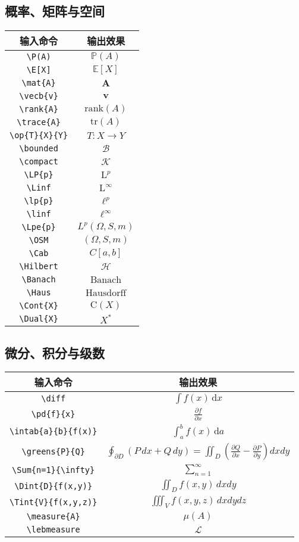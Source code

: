 \documentclass[12pt,a4paper]{ctexart}
\providecommand{\E}{\ensuremath{\mathbb{E}}} %
\providecommand{\P}{\ensuremath{\mathbb{P}}} %
\newcommand{\mat}[1]{\mathbf{#1}} %
\newcommand{\vecb}[1]{\mathbf{#1}} %
\newcommand{\rank}[1]{\mathrm{rank}(#1)} %
\newcommand{\trace}[1]{\mathrm{tr}(#1)} %
\newcommand{\Sum}[2]{\sum\limits_{#1}^{#2}}
\newcommand{\Dint}[2]{\iint_{#1} #2 \, dx dy}
\newcommand{\Tint}[2]{\iiint_{#1} #2 \, dx dy dz}
\newcommand{\measure}[1]{\mu\left( #1 \right)}
\newcommand{\lebmeasure}{\mathcal{L}}
\newcommand{\op}[3]{\ensuremath{#1: #2 \to #3}}                  %
\newcommand{\bounded}{\ensuremath{\mathcal{B}}}                %
\newcommand{\compact}{\ensuremath{\mathcal{K}}}                %
\newcommand{\LP}[1]{\ensuremath{\mathrm{L}^{#1}}}              %
\newcommand{\Linf}{\ensuremath{\mathrm{L}^\infty}}              %
\newcommand{\lp}[1]{\ensuremath{\ell^{#1}}}                    %
\newcommand{\linf}{\ensuremath{\ell^\infty}}                   %
\providecommand{\Lpe}[1]{\ensuremath{L^{#1}(\Omega, S, m)}}  %
\providecommand{\OSM}{\ensuremath{(\Omega, S, m)}}          %
\providecommand{\Cab}{\ensuremath{C[a, b]}}               %
\providecommand{\Linf}{\ensuremath{L^\infty(\Omega, S, m)}} %
\newcommand{\diff}{\ensuremath{\,\mathrm{d}}}                   %
\newcommand{\pd}[2]{\ensuremath{\frac{\partial #1}{\partial #2}}} %
\newcommand{\intab}[3]{\ensuremath{\int_{#1}^{#2} #3 \diff #1}} %
\newcommand{\Banach}{\ensuremath{\text{Banach}}}               %
\newcommand{\Haus}{\ensuremath{\text{Hausdorff}}}              %
\newcommand{\Hilbert}{\ensuremath{\mathcal{H}}}                %
\newcommand{\Cont}[1]{\ensuremath{\mathrm{C}(#1)}}             %
\newcommand{\Dual}[1]{\ensuremath{{#1}^*}}                     %
\newcommand{\greens}[2]{%
	\oint_{\partial D} \left( #1 \, dx + #2 \, dy \right) = 
	\iint_{D} \left( \pd{#2}{x} - \pd{#1}{y} \right) dx dy
}
\begin{document}
\subsection*{概率、矩阵与空间}
\begin{center}
	\begin{tabular}{|c|c|}
		\hline
		输入命令 & 输出效果 \\
		\hline
		\verb|\P(A)| & $\P(A)$ \\
		\verb|\E[X]| & $\E[X]$ \\
		\verb|\mat{A}| & $\mat{A}$ \\
		\verb|\vecb{v}| & $\vecb{v}$ \\
		\verb|\rank{A}| & $\rank{A}$ \\
		\verb|\trace{A}| & $\trace{A}$ \\
		\verb|\op{T}{X}{Y}| & $\op{T}{X}{Y}$ \\
		\verb|\bounded| & $\bounded$ \\
		\verb|\compact| & $\compact$ \\
		\verb|\LP{p}| & $\LP{p}$ \\
		\verb|\Linf| & $\Linf$ \\
		\verb|\lp{p}| & $\lp{p}$ \\
		\verb|\linf| & $\linf$ \\
		\verb|\Lpe{p}| & $\Lpe{p}$ \\
		\verb|\OSM| & $\OSM$ \\
		\verb|\Cab| & $\Cab$ \\
		\verb|\Hilbert| & $\Hilbert$ \\
		\verb|\Banach| & $\Banach$ \\
		\verb|\Haus| & $\Haus$ \\
		\verb|\Cont{X}| & $\Cont{X}$ \\
		\verb|\Dual{X}| & $\Dual{X}$ \\
		\hline
	\end{tabular}
\end{center}

\subsection*{微分、积分与级数}
\begin{center}
	\begin{tabular}{|c|c|}
		\hline
		输入命令 & 输出效果 \\
		\hline
		\verb|\diff| & $\int f(x) \diff x$ \\
		\verb|\pd{f}{x}| & $\pd{f}{x}$ \\
		\verb|\intab{a}{b}{f(x)}| & $\intab{a}{b}{f(x)}$ \\
		\verb|\greens{P}{Q}| & $\greens{P}{Q}$ \\
		\verb|\Sum{n=1}{\infty}| & $\Sum{n=1}{\infty}$ \\
		\verb|\Dint{D}{f(x,y)}| & $\Dint{D}{f(x,y)}$ \\
		\verb|\Tint{V}{f(x,y,z)}| & $\Tint{V}{f(x,y,z)}$ \\
		\verb|\measure{A}| & $\measure{A}$ \\
		\verb|\lebmeasure| & $\lebmeasure$ \\
		\hline
	\end{tabular}
\end{center}
\end{document}
